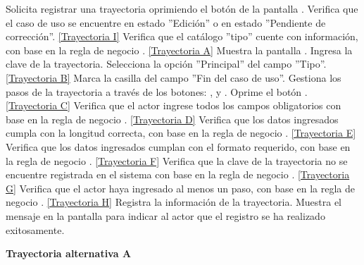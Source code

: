 	\begin{UCtrayectoria}
		\UCpaso[\UCactor] Solicita registrar una trayectoria oprimiendo el botón  de la pantalla .
		\UCpaso[\UCsist] Verifica que el caso de uso se encuentre en estado ''Edición'' o en estado ''Pendiente de corrección''. \hyperlink{CU12-1-1-1:TAI}{[Trayectoria I]}
		\UCpaso[\UCsist] Verifica que el catálogo ''tipo'' cuente con información, con base en la regla de negocio . \hyperlink{CU12-1-1-1:TAA}{[Trayectoria A]}
		\UCpaso[\UCsist] Muestra la pantalla . \label{CU12.1.1.1-P17}
		\UCpaso[\UCactor] Ingresa la clave de la trayectoria. \label{CU12.1.1.1-P16}
		\UCpaso[\UCactor] Selecciona la opción ''Principal'' del campo ''Tipo''. \hyperlink{CU12-1-1-1:TAB}{[Trayectoria B]} 
		\UCpaso[\UCsist] Marca la casilla del campo ''Fin del caso de uso''.
		\UCpaso[\UCactor] Gestiona los pasos de la trayectoria a través de los botones: , \editar y \eliminar. \label{CU12.1.1.1-P18}
		\UCpaso[\UCactor] Oprime el botón  . \hyperlink{CU12-1-1-1:TAC}{[Trayectoria C]} 
		\UCpaso[\UCsist] Verifica que el actor ingrese todos los campos obligatorios con base en la regla de negocio . \hyperlink{CU12-1-1-1:TAD}{[Trayectoria D]}
		\UCpaso[\UCsist] Verifica que los datos ingresados cumpla con la longitud correcta, con base en la regla de negocio . \hyperlink{CU12-1-1-1:TAE}{[Trayectoria E]}
		\UCpaso[\UCsist] Verifica que los datos ingresados cumplan con el formato requerido, con base en la regla de negocio . \hyperlink{CU12-1-1-1:TAF}{[Trayectoria F]}
		\UCpaso[\UCsist] Verifica que la clave de la trayectoria no se encuentre registrada en el sistema con base en la regla de negocio . \hyperlink{CU12-1-1-1:TAG}{[Trayectoria G]}
		\UCpaso[\UCsist] Verifica que el actor haya ingresado al menos un paso, con base en la regla de negocio . \hyperlink{CU12-1-1-1:TAH}{[Trayectoria H]}
		\UCpaso[\UCsist] Registra la información de la trayectoria.
		\UCpaso[\UCsist] Muestra el mensaje  en la pantalla  para indicar al actor que el registro se ha realizado exitosamente.
	\end{UCtrayectoria}		
\hypertarget{CU12-1-1-1:TAA}{\textbf{Trayectoria alternativa A}}\\
